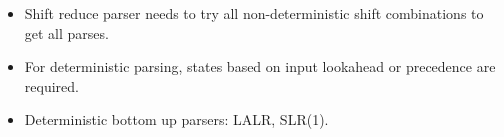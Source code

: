 \begin{frame}
\begin{itemize}
\item Shift reduce parser needs to try all non-deterministic shift combinations to get all parses.
\item For deterministic parsing, states based on input lookahead or
	precedence are required.
\item Deterministic bottom up parsers: LALR, SLR(1).
\end{itemize}
\end{frame}

